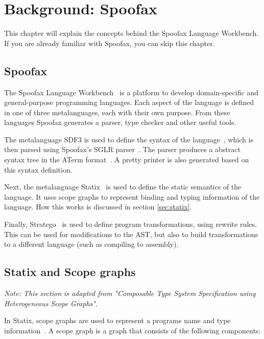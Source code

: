 \chapter{\label{chap:bg-spoofax}Background: Spoofax}

This chapter will explain the concepts behind the Spoofax Language Workbench. If you are already familiar with Spoofax, you can skip this chapter. 

\section{Spoofax}

The Spoofax Language Workbench~\cite{spoofax} is a platform to develop domain-specific and
general-purpose programming languages. Each aspect of the language is defined in one of three metalanguages, each with their own purpose. From these languages Spoofax generates a parser, type checker and other useful tools. 

The metalanguage SDF3 is used to define the syntax of the language~\cite{sdf3}, which is then parsed using Spoofax's SGLR parser~\cite{sdf3_parser}. The parser produces a abstract syntax tree in the ATerm format~\cite{aterm}. A pretty printer is also generated based on this syntax definition. 

Next, the metalanguage Statix~\cite{scopes_as_types} is used to define the static semantics of the language. It uses scope graphs to represent binding and typing information of the language. How this works is discussed in section \ref{sec:statix}.

Finally, Stratego~\cite{stratego} is used to define program transformations, using rewrite rules. This can be used for modifications to the AST, but also to build transformations to a different language (such as compiling to assembly). 

\section{\label{sec:statix}Statix and Scope graphs}

\textit{Note: This section is adapted from "Composable Type System Specification
	using Heterogeneous Scope Graphs".~\cite[sect. 4.1.2]{Zwaan21}}

In Statix, scope graphs are used to represent a programs name and type information~\cite{scopes_as_types}. A scope graph is a graph that consists of the following components:

